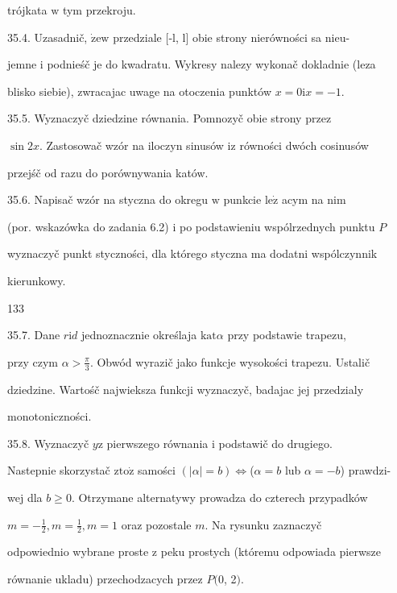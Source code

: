 \documentclass[a4paper,12pt]{article}
\begin{document}
trójkata $\mathrm{w}$ tym przekroju.

35.4. Uzasadnič, $\dot{\mathrm{z}}\mathrm{e}\mathrm{w}$ przedziale [-l, l] obie strony nierówności sa nieu-

jemne $\mathrm{i}$ podnieśč je do kwadratu. Wykresy nalezy wykonač dokladnie (leza

blisko siebie), zwracajac uwage na otoczenia punktów $x=0\mathrm{i}x=-1.$

35.5. Wyznaczyč dziedzine równania. Pomnozyč obie strony przez

$\sin 2x$. Zastosowač wzór na iloczyn sinusów $\mathrm{i}\mathrm{z}$ równości dwóch cosinusów

przejśč od razu do porównywania katów.

35.6. Napisač wzór na styczna do okregu $\mathrm{w}$ punkcie $\mathrm{l}\mathrm{e}\dot{\mathrm{z}}$ acym na nim

(por. wskazówka do zadania 6.2) $\mathrm{i}$ po podstawieniu wspólrzednych punktu $P$

wyznaczyč punkt styczności, dla którego styczna ma dodatni wspólczynnik

kierunkowy.





133

35.7. Dane $r\mathrm{i}d$ jednoznacznie określaja $\mathrm{k}\mathrm{a}\mathrm{t}\alpha$ przy podstawie trapezu,

przy czym $\displaystyle \alpha>\frac{\pi}{3}$. Obwód wyrazič jako funkcje wysokości trapezu. Ustalič

dziedzine. Wartośč najwieksza funkcji wyznaczyč, badajac jej przedzialy

monotoniczności.

35.8. Wyznaczyč $y \mathrm{z}$ pierwszego równania $\mathrm{i}$ podstawič do drugiego.

Nastepnie skorzystač $\mathrm{z}\mathrm{t}\mathrm{o}\dot{\mathrm{z}}$ samości $(|\alpha|=b)\Leftrightarrow$($\alpha=b$ lub $\alpha=-b$) prawdzi-

wej dla $b\geq 0$. Otrzymane alternatywy prowadza do czterech przypadków

$m = -\displaystyle \frac{1}{2}, m = \displaystyle \frac{1}{2}, m = 1$ oraz pozostale $m$. Na rysunku zaznaczyč

odpowiednio wybrane proste $\mathrm{z}$ peku prostych (któremu odpowiada pierwsze

równanie ukladu) przechodzacych przez $P(0$, 2$).$
\end{document}
